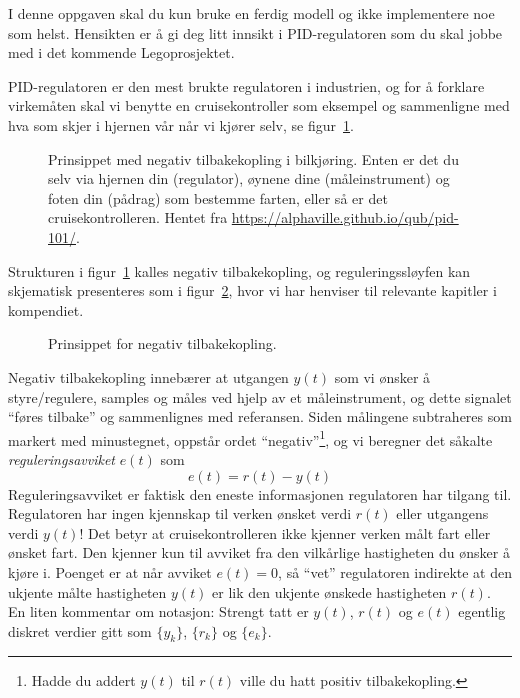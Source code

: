 


  \item[q)]
    I denne oppgaven skal du kun bruke en ferdig modell og ikke
    implementere noe som helst. Hensikten
    er å gi deg litt innsikt i PID-regulatoren som du skal jobbe med i
    det kommende Legoprosjektet.

    PID-regulatoren er den mest brukte regulatoren i industrien, og
    for å forklare virkemåten skal vi benytte en cruisekontroller som
    eksempel og sammenligne med hva som skjer i hjernen vår når vi
    kjører selv, se figur~\ref{fig:neg_feedback3}.
\begin{figure}[H]
  \centering
  \hspace*{5mm}
  \caption{Prinsippet med negativ tilbakekopling i bilkjøring. Enten
    er det du selv via hjernen din (regulator), øynene dine
    (måleinstrument) og foten din (pådrag) som bestemme farten, eller
    så er det cruisekontrolleren. Hentet fra
    {\color{blue}\href{https://alphaville.github.io/qub/pid-101/}
  {https://alphaville.github.io/qub/pid-101/}}.}
  \label{fig:neg_feedback3}
\end{figure}



Strukturen i figur~\ref{fig:neg_feedback3} kalles
negativ  tilbakekopling, og reguleringssløyfen kan skjematisk
presenteres som i figur~\ref{fig:neg_feedback2}, hvor vi har henviser
til relevante kapitler i kompendiet. 
\begin{figure}[H]
  \centering
  \caption{Prinsippet for negativ tilbakekopling.}
  \label{fig:neg_feedback2}
\end{figure}
Negativ tilbakekopling innebærer at utgangen $y(t)$ som vi
ønsker å styre/regulere, samples og måles ved hjelp av et
måleinstrument, og dette signalet ``føres tilbake'' og 
sammenlignes med referansen. Siden målingene subtraheres
som markert med minustegnet, oppstår ordet ``negativ''\footnote{Hadde du
  addert $y(t)$ til $r(t)$ ville du 
hatt positiv tilbakekopling.}, og vi 
beregner det såkalte {\it reguleringsavviket} $e(t)$ som
\begin{equation}
  \label{eq:22}
  e(t) = r(t) -y(t)
\end{equation}
Reguleringsavviket er faktisk den eneste informasjonen regulatoren har
tilgang til. {\color{red}Regulatoren har ingen kjennskap til verken
  ønsket verdi $r(t)$ eller utgangens verdi $y(t)$!}
Det betyr at cruisekontrolleren ikke kjenner 
 verken målt fart  eller ønsket fart. Den kjenner kun til 
avviket fra den vilkårlige hastigheten du ønsker å kjøre i.
Poenget er at når avviket $e(t){=}0$, så ``vet'' regulatoren
indirekte at den ukjente målte hastigheten $y(t)$ er lik den ukjente
ønskede hastigheten $r(t)$. En liten kommentar om notasjon:
Strengt tatt er $y(t)$, $r(t)$ og $e(t)$ egentlig diskret verdier gitt
som $\{y_{k}\}$, $\{r_{k}\}$ og $\{e_{k}\}$.


